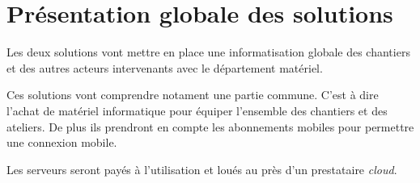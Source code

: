 \section{Présentation globale des solutions}

Les deux solutions vont mettre en place une informatisation globale des 
chantiers et des autres acteurs intervenants avec le département matériel.

Ces solutions vont comprendre notament une partie commune. C'est à dire l'achat 
de matériel informatique pour équiper l'ensemble des chantiers et des ateliers.
De plus ils prendront en compte les abonnements mobiles pour permettre une connexion
mobile.

Les serveurs seront payés à l'utilisation et loués au près d'un prestataire {\sl cloud}.

